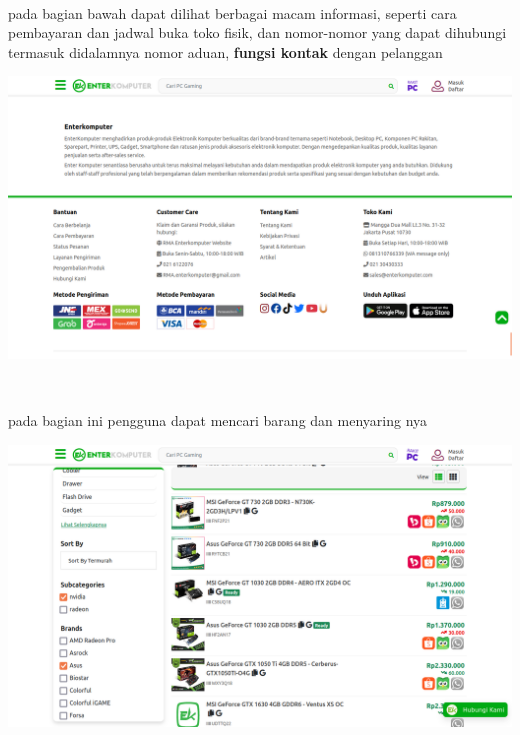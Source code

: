 \documentclass{article}
\begin{document}
\\
\begin{minipage}{0.30\textwidth}
    pada bagian bawah dapat dilihat berbagai macam informasi, seperti cara pembayaran dan  jadwal buka toko fisik, dan nomor-nomor yang dapat dihubungi termasuk didalamnya nomor aduan, 
    \textbf{fungsi kontak} dengan pelanggan
\end{minipage}
\hspace*{0.04\textwidth}
\begin{minipage}{0.65\textwidth}
    \includegraphics[width=\textwidth]{file-22.png}
\end{minipage}
\\
\begin{minipage}{0.30\textwidth}
    pada bagian ini pengguna dapat mencari barang dan menyaring nya
\end{minipage}
\hspace*{0.04\textwidth}
\begin{minipage}{0.65\textwidth}
    \includegraphics[width=\textwidth]{file-20.png}
\end{minipage}
\\
\end{document}
